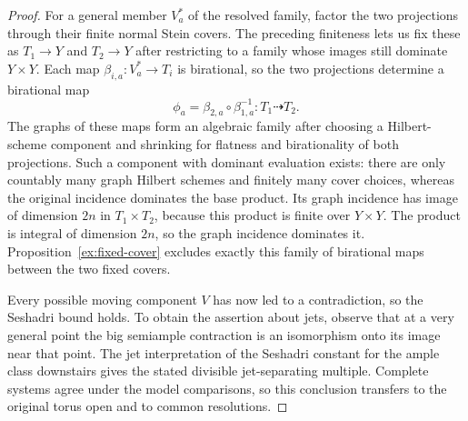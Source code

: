 \begin{proof}
For a general member \(V_a^*\) of the resolved family, factor the two
projections through their finite normal Stein covers. The preceding
finiteness lets us fix these as \(T_1\to Y\) and \(T_2\to Y\) after
restricting to a family whose images still dominate \(Y\times Y\).
Each map \(\beta_{i,a}:V_a^*\to T_i\) is birational, so the two
projections determine a birational map
\[
 \phi_a=\beta_{2,a}\circ\beta_{1,a}^{-1}:T_1\dashrightarrow T_2.
\]
The graphs of these maps form an algebraic family after choosing a
Hilbert-scheme component and shrinking for flatness and birationality
of both projections. Such a component with dominant evaluation exists:
there are only countably many graph Hilbert schemes and finitely many
cover choices, whereas the original incidence dominates the base
product. Its graph incidence has image of dimension \(2n\) in
\(T_1\times T_2\), because this product is finite over \(Y\times Y\).
The product is integral of dimension \(2n\), so the graph incidence
dominates it. Proposition~\ref{ex:fixed-cover} excludes exactly this
family of birational maps between the two fixed covers.

Every possible moving component \(V\) has now led to a contradiction,
so the Seshadri bound holds.  To obtain the assertion about jets,
observe that at a very general point the big semiample
contraction is an isomorphism onto its image near that point.
The jet interpretation of the Seshadri constant for the ample
class downstairs gives the stated divisible jet-separating
multiple.  Complete systems agree under the model comparisons,
so this conclusion transfers to the original torus open and to
common resolutions.
\end{proof}
